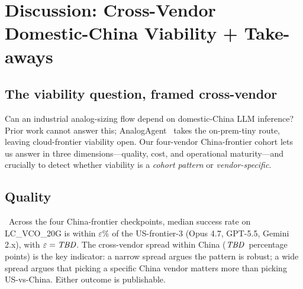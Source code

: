 
\section{Discussion: Cross-Vendor Domestic-China Viability + Take-aways}
\label{sec:discussion}

\subsection{The viability question, framed cross-vendor}
\label{sec:disc-question}

Can an industrial analog-sizing flow depend on domestic-China LLM
inference? Prior work cannot answer this;
AnalogAgent~\cite{analogagent} takes the on-prem-tiny route,
leaving cloud-frontier viability open. Our four-vendor
China-frontier cohort lets us answer in three dimensions---quality,
cost, and operational maturity---and crucially to detect whether
viability is a \emph{cohort pattern} or \emph{vendor-specific}.

\subsection{Quality}
\label{sec:disc-quality}

\tbdeight\ Across the four China-frontier checkpoints, median
success rate on LC\_VCO\_20G is within $\varepsilon\%$ of the
US-frontier-3 (Opus 4.7, GPT-5.5, Gemini 2.x), with $\varepsilon =
\textit{TBD}$. The cross-vendor spread within China
($\textit{TBD}$~percentage points) is the key indicator: a narrow
spread argues the pattern is robust; a wide spread argues that
picking a specific China vendor matters more than picking
US-vs-China. Either outcome is publishable.

